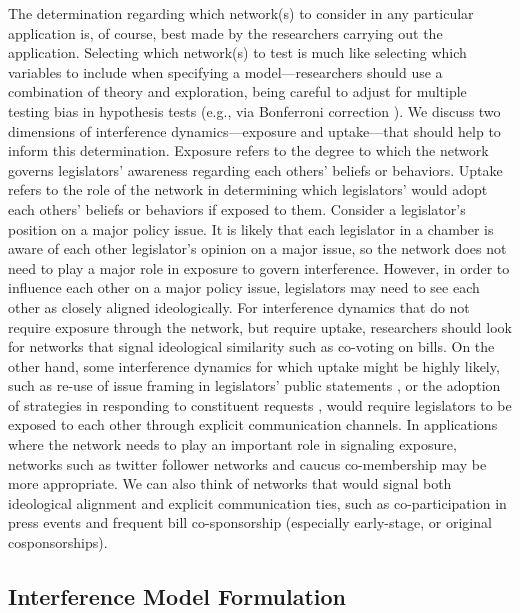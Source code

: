 \documentclass[12pt]{article}
\begin{document}
The determination regarding which network(s) to consider in any particular application is, of course, best made by the researchers carrying out the application. Selecting which network(s) to test is much like selecting which variables to include when specifying a model---researchers should use a combination of theory and exploration, being careful to adjust for multiple testing bias in hypothesis tests (e.g., via Bonferroni correction \citep{napierala2012bonferroni}). We discuss two dimensions of interference dynamics---exposure and uptake---that should help to inform this determination. Exposure refers to the degree to which the network governs legislators' awareness regarding each others' beliefs or behaviors. Uptake refers to the role of the network in determining which legislators' would adopt each others' beliefs or behaviors if exposed to them. Consider a legislator's position on a major policy issue. It is likely that each legislator in a chamber is aware of each other legislator's opinion on a major issue, so the network does not need to play a major role in exposure to govern interference. However, in order to influence each other on a major policy issue, legislators may need to see each other as closely aligned ideologically. For interference dynamics that do not require exposure through the network, but require uptake, researchers should look for networks that signal ideological similarity such as co-voting on bills. On the other hand, some interference dynamics for which uptake might be highly likely, such as re-use of issue framing in legislators' public statements \citep{lin2016uncovering}, or the adoption of strategies in responding to constituent requests \citep{grose2015explainin}, would require legislators to be exposed to each other through explicit communication channels.  In applications where the network needs to play an important role in signaling exposure, networks such as twitter follower networks and caucus co-membership may be more appropriate. We can also think of networks that would signal both ideological alignment and explicit communication ties, such as co-participation in press events and frequent bill co-sponsorship (especially early-stage, or original cosponsorships).  



\subsection{Interference Model Formulation}
\end{document}

